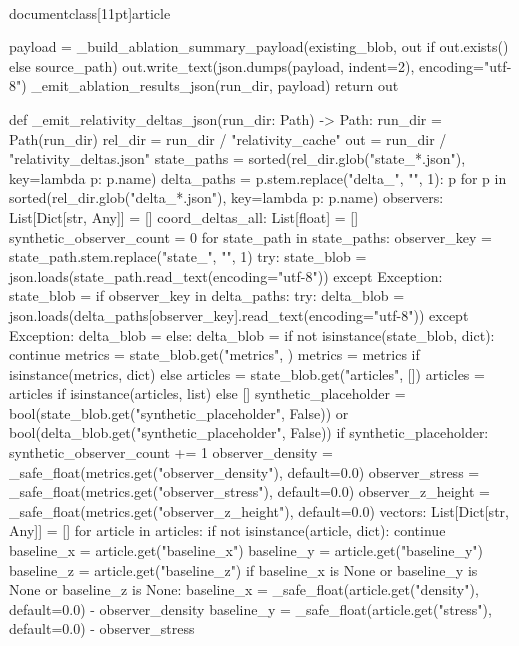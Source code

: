 \\documentclass[11pt]{article}
\begin{document}
\begin{CodeBlock}
    payload = _build_ablation_summary_payload(existing_blob, out if out.exists() else source_path)
    out.write_text(json.dumps(payload, indent=2), encoding="utf-8")
    _emit_ablation_results_json(run_dir, payload)
    return out


def _emit_relativity_deltas_json(run_dir: Path) -> Path:
    run_dir = Path(run_dir)
    rel_dir = run_dir / "relativity_cache"
    out = run_dir / "relativity_deltas.json"
    state_paths = sorted(rel_dir.glob("state_*.json"), key=lambda p: p.name)
    delta_paths = {
        p.stem.replace("delta_", "", 1): p
        for p in sorted(rel_dir.glob("delta_*.json"), key=lambda p: p.name)
    }
    observers: List[Dict[str, Any]] = []
    coord_deltas_all: List[float] = []
    synthetic_observer_count = 0
    for state_path in state_paths:
        observer_key = state_path.stem.replace("state_", "", 1)
        try:
            state_blob = json.loads(state_path.read_text(encoding="utf-8"))
        except Exception:
            state_blob = {}
        if observer_key in delta_paths:
            try:
                delta_blob = json.loads(delta_paths[observer_key].read_text(encoding="utf-8"))
            except Exception:
                delta_blob = {}
        else:
            delta_blob = {}
        if not isinstance(state_blob, dict):
            continue
        metrics = state_blob.get("metrics", {})
        metrics = metrics if isinstance(metrics, dict) else {}
        articles = state_blob.get("articles", [])
        articles = articles if isinstance(articles, list) else []
        synthetic_placeholder = bool(state_blob.get("synthetic_placeholder", False)) or bool(delta_blob.get("synthetic_placeholder", False))
        if synthetic_placeholder:
            synthetic_observer_count += 1
        observer_density = _safe_float(metrics.get("observer_density"), default=0.0)
        observer_stress = _safe_float(metrics.get("observer_stress"), default=0.0)
        observer_z_height = _safe_float(metrics.get("observer_z_height"), default=0.0)
        vectors: List[Dict[str, Any]] = []
        for article in articles:
            if not isinstance(article, dict):
                continue
            baseline_x = article.get("baseline_x")
            baseline_y = article.get("baseline_y")
            baseline_z = article.get("baseline_z")
            if baseline_x is None or baseline_y is None or baseline_z is None:
                baseline_x = _safe_float(article.get("density"), default=0.0) - observer_density
                baseline_y = _safe_float(article.get("stress"), default=0.0) - observer_stress

\end{CodeBlock}
\end{document}
